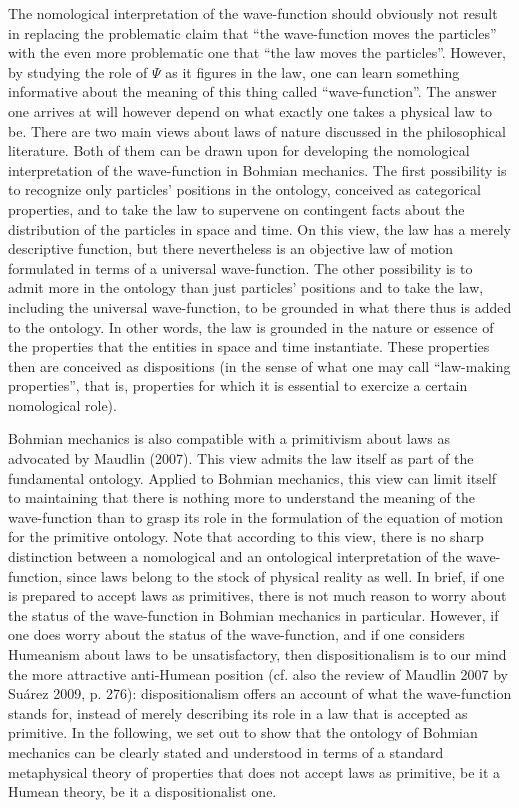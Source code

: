\documentclass[12pt]{article}
\theoremstyle{definition}
\begin{document}
The nomological interpretation of the wave-function should obviously not result in replacing the problematic claim that ``the wave-function moves the particles'' with the even more problematic one that ``the law moves the particles''. However, by studying the role of $\Psi$ as it figures in the law, one can learn something informative about the meaning of this thing called ``wave-function''. The answer one arrives at will however depend on what exactly one takes a physical law to be. There are two main views about laws of nature discussed in the philosophical literature. Both of them can be drawn upon for developing the nomological interpretation of the wave-function in Bohmian mechanics. The first possibility is to recognize only particles' positions in the ontology, conceived as categorical properties, and to take the law to supervene on contingent facts about the distribution of the particles in space and time. On this view, the law has a merely descriptive function, but there nevertheless is an objective law of motion formulated in terms of a universal wave-function. The other possibility is to admit more in the ontology than just particles' positions and to take the law, including the universal wave-function, to be grounded in what there thus is added to the ontology. In other words, the law is grounded in the nature or essence of the properties that the entities in space and time instantiate. These properties then are conceived as dispositions (in the sense of what one may call ``law-making properties'', that is, properties for which it is essential to exercize a certain nomological role).

Bohmian mechanics is also compatible with a primitivism about laws as advocated by Maudlin (2007). This view admits the law itself as part of the fundamental ontology. Applied to Bohmian mechanics, this view can limit itself to maintaining that there is nothing more to understand the meaning of the wave-function than to grasp its role in the formulation of the equation of motion for the primitive ontology. Note that according to this view, there is no sharp distinction between a nomological and an ontological interpretation of the wave-function, since laws belong to the stock of physical reality as well. In brief, if one is prepared to accept laws as primitives, there is not much reason to worry about the status of the wave-function in Bohmian mechanics in particular. However, if one does worry about the status of the wave-function, and if one considers Humeanism about laws to be unsatisfactory, then dispositionalism is to our mind the more attractive anti-Humean position (cf. also the review of Maudlin 2007 by Su\'arez 2009, p. 276): dispositionalism offers an account of what the wave-function stands for, instead of merely describing its role in a law that is accepted as primitive. In the following, we set out to show that the ontology of Bohmian mechanics can be clearly stated and understood in terms of a standard metaphysical theory of properties that does not accept laws as primitive, be it a Humean theory, be it a dispositionalist one.
\end{document}
